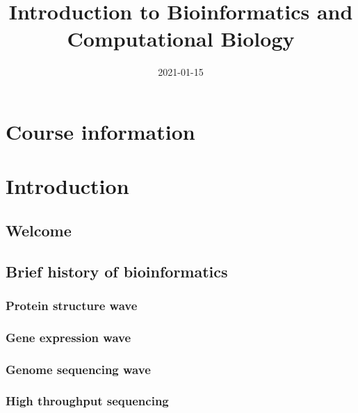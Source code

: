 \documentclass[]{book}
\title{Introduction to Bioinformatics and Computational Biology}
\author{}
\date{\vspace{-2.5em}2021-01-15}
\begin{document}
\maketitle

{
\setcounter{tocdepth}{1}
\tableofcontents
}
\hypertarget{course-information}{%
\chapter{Course information}\label{course-information}}

\hypertarget{intro}{%
\chapter{Introduction}\label{intro}}

\hypertarget{welcome}{%
\section{Welcome}\label{welcome}}

\hypertarget{brief-history-of-bioinformatics}{%
\section{Brief history of bioinformatics}\label{brief-history-of-bioinformatics}}

\hypertarget{protein-structure-wave}{%
\subsection{Protein structure wave}\label{protein-structure-wave}}

\hypertarget{gene-expression-wave}{%
\subsection{Gene expression wave}\label{gene-expression-wave}}

\hypertarget{genome-sequencing-wave}{%
\subsection{Genome sequencing wave}\label{genome-sequencing-wave}}

\hypertarget{high-throughput-sequencing}{%
\subsection{High throughput sequencing}\label{high-throughput-sequencing}}
\end{document}
